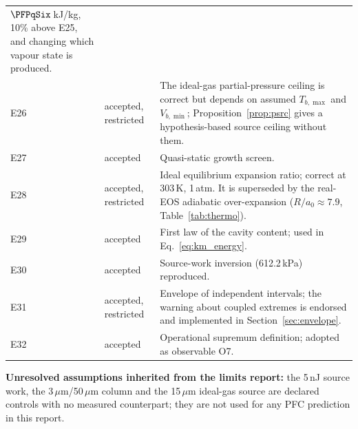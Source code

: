 \begin{center}
\begin{longtable}{p{}p{}p{}}
$\PFPqSix$\,kJ/kg, 10\% above E25, and changing which vapour state is produced.\\
E26 & accepted, restricted & The ideal-gas partial-pressure ceiling is correct but depends on assumed
$T_{b,\max}$ and $V_{b,\min}$; Proposition~\ref{prop:psrc} gives a hypothesis-based source ceiling without
them.\\
E27 & accepted & Quasi-static growth screen.\\
E28 & accepted, restricted & Ideal equilibrium expansion ratio; correct at 303\,K, 1\,atm. It is
superseded by the real-EOS adiabatic over-expansion ($R/a_0\approx7.9$, Table~\ref{tab:thermo}).\\
E29 & accepted & First law of the cavity content; used in Eq.~\eqref{eq:km_energy}.\\
E30 & accepted & Source-work inversion (612.2\,kPa) reproduced.\\
E31 & accepted, restricted & Envelope of independent intervals; the warning about coupled extremes is
endorsed and implemented in Section~\ref{sec:envelope}.\\
E32 & accepted & Operational supremum definition; adopted as observable O7.\\
\bottomrule
\end{longtable}
\end{center}
\textbf{Unresolved assumptions inherited from the limits report:} the 5\,nJ source work, the
3\,$\mu$m/50\,$\mu$m column and the 15\,$\mu$m ideal-gas source are declared controls with no measured
counterpart; they are not used for any PFC prediction in this report.

